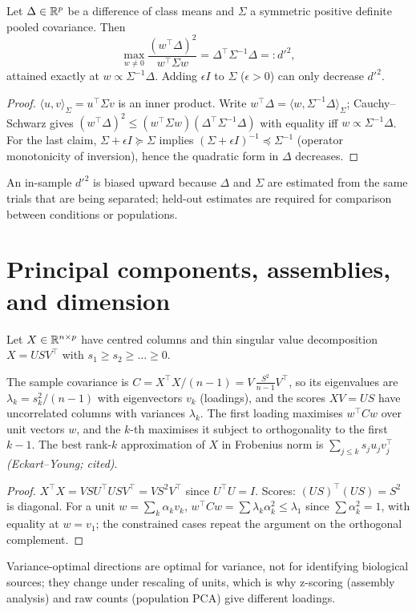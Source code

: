 \begin{theorem}\label{ars:lin-004}
Let $\Delta\in\mathbb R^p$ be a difference of class means and $\Sigma$ a symmetric positive definite pooled covariance. Then
\[\max_{w\ne0}\frac{(w^\top\Delta)^2}{w^\top\Sigma w}=\Delta^\top\Sigma^{-1}\Delta=:d'^2,\]
attained exactly at $w\propto\Sigma^{-1}\Delta$. Adding $\epsilon I$ to $\Sigma$ ($\epsilon>0$) can only decrease $d'^2$.
\end{theorem}
\begin{proof}
$\langle u,v\rangle_\Sigma=u^\top\Sigma v$ is an inner product. Write $w^\top\Delta=\langle w,\Sigma^{-1}\Delta\rangle_\Sigma$; Cauchy--Schwarz gives $(w^\top\Delta)^2\le(w^\top\Sigma w)(\Delta^\top\Sigma^{-1}\Delta)$ with equality iff $w\propto\Sigma^{-1}\Delta$. For the last claim, $\Sigma+\epsilon I\succeq\Sigma$ implies $(\Sigma+\epsilon I)^{-1}\preceq\Sigma^{-1}$ (operator monotonicity of inversion), hence the quadratic form in $\Delta$ decreases.
\end{proof}
An in-sample $d'^2$ is biased upward because $\Delta$ and $\Sigma$ are estimated from the same trials that are being separated; held-out estimates are required for comparison between conditions or populations.

\section{Principal components, assemblies, and dimension}
Let $X\in\mathbb R^{n\times p}$ have centred columns and thin singular value decomposition $X=USV^\top$ with $s_1\ge s_2\ge\dots\ge0$.

\begin{theorem}\label{ars:pca-001}
The sample covariance is $C=X^\top X/(n-1)=V\,\frac{S^2}{n-1}V^\top$, so its eigenvalues are $\lambda_k=s_k^2/(n-1)$ with eigenvectors $v_k$ (loadings), and the scores $XV=US$ have uncorrelated columns with variances $\lambda_k$. The first loading maximises $w^\top Cw$ over unit vectors $w$, and the $k$-th maximises it subject to orthogonality to the first $k-1$. The best rank-$k$ approximation of $X$ in Frobenius norm is $\sum_{j\le k}s_ju_jv_j^\top$ \emph{(Eckart--Young; cited)}.
\end{theorem}
\begin{proof}
$X^\top X=VSU^\top USV^\top=VS^2V^\top$ since $U^\top U=I$. Scores: $(US)^\top(US)=S^2$ is diagonal. For a unit $w=\sum_k\alpha_kv_k$, $w^\top Cw=\sum\lambda_k\alpha_k^2\le\lambda_1$ since $\sum\alpha_k^2=1$, with equality at $w=v_1$; the constrained cases repeat the argument on the orthogonal complement.
\end{proof}
Variance-optimal directions are optimal for variance, not for identifying biological sources; they change under rescaling of units, which is why z-scoring (assembly analysis) and raw counts (population PCA) give different loadings.

